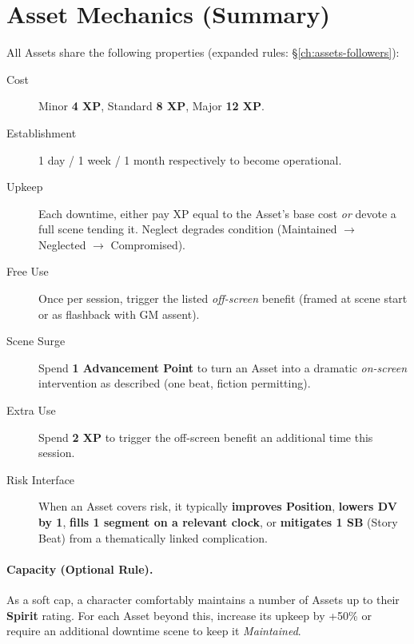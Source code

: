 \section{Asset Mechanics (Summary)}
All Assets share the following properties (expanded rules: \S\ref{ch:assets-followers}):
\begin{description}
  \item[Cost] Minor \textbf{4 XP}, Standard \textbf{8 XP}, Major \textbf{12 XP}. 
  \item[Establishment] 1 day / 1 week / 1 month respectively to become operational.
  \item[Upkeep] Each downtime, either pay XP equal to the Asset’s base cost \emph{or} devote a full scene tending it. Neglect degrades condition (Maintained $\rightarrow$ Neglected $\rightarrow$ Compromised). 
  \item[Free Use] Once per session, trigger the listed \emph{off-screen} benefit (framed at scene start or as flashback with GM assent).
  \item[Scene Surge] Spend \textbf{1 Advancement Point} to turn an Asset into a dramatic \emph{on-screen} intervention as described (one beat, fiction permitting). 
  \item[Extra Use] Spend \textbf{2 XP} to trigger the off-screen benefit an additional time this session.
  \item[Risk Interface] When an Asset covers risk, it typically \textbf{improves Position}, \textbf{lowers DV by 1}, \textbf{fills 1 segment on a relevant clock}, or \textbf{mitigates 1 SB} (Story Beat) from a thematically linked complication. 
\end{description}

\paragraph{Capacity (Optional Rule).}
As a soft cap, a character comfortably maintains a number of Assets up to their \textbf{Spirit} rating. For each Asset beyond this, increase its upkeep by +50\% or require an additional downtime scene to keep it \emph{Maintained}.

